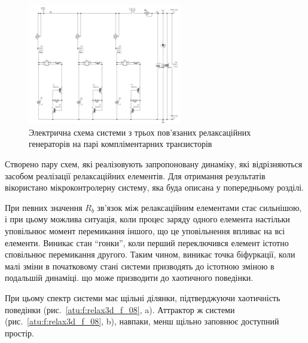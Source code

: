 \documentclass[a4paper,13pt]{atuaref}
\begin{document}

\begin{figure}[htb!]
  \centerline{\includegraphics[width=0.6\textwidth]{p7/p/relax3d_schem.png} }
  \caption{Электрична схема системи з трьох пов'язаних релаксаційних генераторів на парі компліментарних транзисторів}
  \label{atu:f:relax3d_schem}
\end{figure}


Створено пару схем,
які реалізовують запропоновану динаміку, які відрізняються
засобом реалізації релаксаційних елементів.
Для отримання результатів вікористано мікроконтролерну систему,
яка буда описана у попередньому розділі.

При певних значення $ R_b $ зв'язок між релаксаційним елементами стає сильнішою,
і при цьому можлива ситуація, коли
процес заряду одного елемента настільки уповільнює момент перемикання іншого,
що це уповільнення впливає на всі елементи. Виникає стан ``гонки'', коли
перший переключився елемент істотно сповільнює перемикання другого. Таким
чином, виникає точка біфуркації, коли малі зміни в початковому стані системи
призводять до істотною зміною в подальшій динаміці. що може призводити до
хаотичного поведінки.

При цьому спектр системи має щільні ділянки, підтверджуючи хаотичність
поведінки (рис.~\ref{atu:f:relax3d_f_08}, a). Аттрактор ж системи
(рис.~\ref{atu:f:relax3d_f_08}, b), навпаки, менш щільно заповнює
доступний простір.
\end{document}
